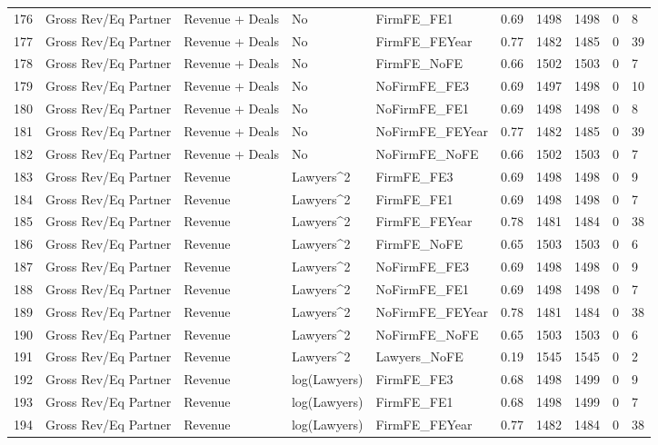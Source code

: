 \documentclass{article}
\begin{document}
\begin{table}[H]
\begin{tabular}{rlllllllll}
  176 & Gross Rev/Eq Partner & Revenue + Deals & No & FirmFE\_FE1 & 0.69 & 1498 & 1498 & 0 & 8 \\ 
  177 & Gross Rev/Eq Partner & Revenue + Deals & No & FirmFE\_FEYear & 0.77 & 1482 & 1485 & 0 & 39 \\ 
  178 & Gross Rev/Eq Partner & Revenue + Deals & No & FirmFE\_NoFE & 0.66 & 1502 & 1503 & 0 & 7 \\ 
  179 & Gross Rev/Eq Partner & Revenue + Deals & No & NoFirmFE\_FE3 & 0.69 & 1497 & 1498 & 0 & 10 \\ 
  180 & Gross Rev/Eq Partner & Revenue + Deals & No & NoFirmFE\_FE1 & 0.69 & 1498 & 1498 & 0 & 8 \\ 
  181 & Gross Rev/Eq Partner & Revenue + Deals & No & NoFirmFE\_FEYear & 0.77 & 1482 & 1485 & 0 & 39 \\ 
  182 & Gross Rev/Eq Partner & Revenue + Deals & No & NoFirmFE\_NoFE & 0.66 & 1502 & 1503 & 0 & 7 \\ 
  183 & Gross Rev/Eq Partner & Revenue & Lawyers^2 & FirmFE\_FE3 & 0.69 & 1498 & 1498 & 0 & 9 \\ 
  184 & Gross Rev/Eq Partner & Revenue & Lawyers^2 & FirmFE\_FE1 & 0.69 & 1498 & 1498 & 0 & 7 \\ 
  185 & Gross Rev/Eq Partner & Revenue & Lawyers^2 & FirmFE\_FEYear & 0.78 & 1481 & 1484 & 0 & 38 \\ 
  186 & Gross Rev/Eq Partner & Revenue & Lawyers^2 & FirmFE\_NoFE & 0.65 & 1503 & 1503 & 0 & 6 \\ 
  187 & Gross Rev/Eq Partner & Revenue & Lawyers^2 & NoFirmFE\_FE3 & 0.69 & 1498 & 1498 & 0 & 9 \\ 
  188 & Gross Rev/Eq Partner & Revenue & Lawyers^2 & NoFirmFE\_FE1 & 0.69 & 1498 & 1498 & 0 & 7 \\ 
  189 & Gross Rev/Eq Partner & Revenue & Lawyers^2 & NoFirmFE\_FEYear & 0.78 & 1481 & 1484 & 0 & 38 \\ 
  190 & Gross Rev/Eq Partner & Revenue & Lawyers^2 & NoFirmFE\_NoFE & 0.65 & 1503 & 1503 & 0 & 6 \\ 
  191 & Gross Rev/Eq Partner & Revenue & Lawyers^2 & Lawyers\_NoFE & 0.19 & 1545 & 1545 & 0 & 2 \\ 
  192 & Gross Rev/Eq Partner & Revenue & log(Lawyers) & FirmFE\_FE3 & 0.68 & 1498 & 1499 & 0 & 9 \\ 
  193 & Gross Rev/Eq Partner & Revenue & log(Lawyers) & FirmFE\_FE1 & 0.68 & 1498 & 1499 & 0 & 7 \\ 
  194 & Gross Rev/Eq Partner & Revenue & log(Lawyers) & FirmFE\_FEYear & 0.77 & 1482 & 1484 & 0 & 38 \\ 

\end{tabular}
\end{table}
\end{document}
